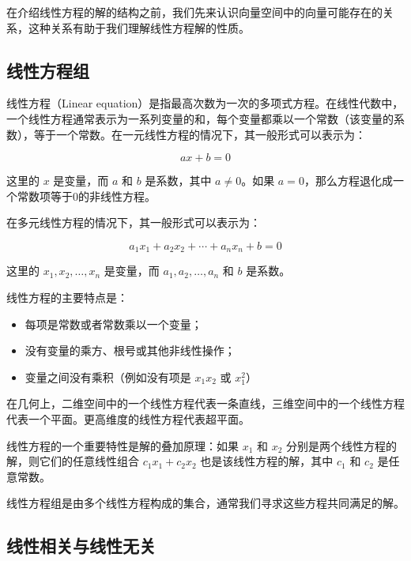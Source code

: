 在介绍线性方程的解的结构之前，我们先来认识向量空间中的向量可能存在的关系，这种关系有助于我们理解线性方程解的性质。

\subsection{线性方程组}
\label{subsec:线性方程组}

线性方程（Linear equation）是指最高次数为一次的多项式方程。在线性代数中，一个线性方程通常表示为一系列变量的和，每个变量都乘以一个常数（该变量的系数），等于一个常数。在一元线性方程的情况下，其一般形式可以表示为：

\[ ax + b = 0 \]

这里的 \( x \) 是变量，而 \( a \) 和 \( b \) 是系数，其中 \( a \neq 0 \)。如果 \( a = 0 \)，那么方程退化成一个常数项等于0的非线性方程。

在多元线性方程的情况下，其一般形式可以表示为：

\[ a_1x_1 + a_2x_2 + \cdots + a_nx_n + b = 0 \]

这里的 \( x_1, x_2, \ldots, x_n \) 是变量，而 \( a_1, a_2, \ldots, a_n \) 和 \( b \) 是系数。

线性方程的主要特点是：

\begin{itemize}
    \item 每项是常数或者常数乘以一个变量；
    \item 没有变量的乘方、根号或其他非线性操作；
    \item 变量之间没有乘积（例如没有项是 \( x_1x_2 \) 或 \( x_1^2 \)）
\end{itemize}

在几何上，二维空间中的一个线性方程代表一条直线，三维空间中的一个线性方程代表一个平面。更高维度的线性方程代表超平面。

线性方程的一个重要特性是解的叠加原理：如果 \( x_1 \) 和 \( x_2 \) 分别是两个线性方程的解，则它们的任意线性组合 \( c_1x_1 + c_2x_2 \) 也是该线性方程的解，其中 \( c_1 \) 和 \( c_2 \) 是任意常数。

线性方程组是由多个线性方程构成的集合，通常我们寻求这些方程共同满足的解。

\subsection{线性相关与线性无关}
\label{subsec:线性相关与线性无关}

